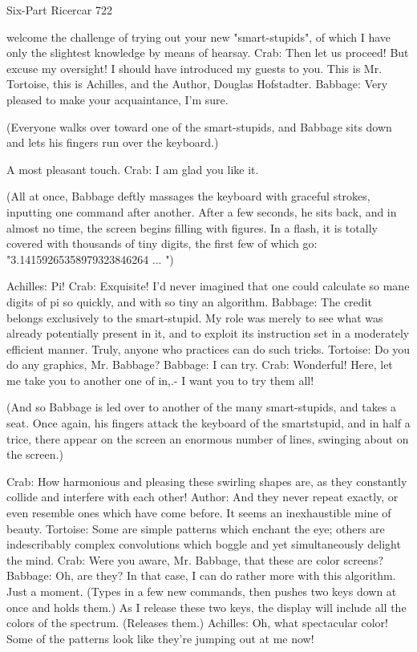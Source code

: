 Six-Part Ricercar                                                                     722

  welcome the challenge of trying out your new "smart-stupids", of which I have only
  the slightest knowledge by means of hearsay.
Crab: Then let us proceed! But excuse my oversight! I should have introduced my guests
  to you. This is Mr. Tortoise, this is Achilles, and the Author, Douglas Hofstadter.
Babbage: Very pleased to make your acquaintance, I'm sure.

   (Everyone walks over toward one of the smart-stupids, and Babbage sits down and
      lets his fingers run over the keyboard.)

   A most pleasant touch. Crab: I am glad you like it.

   (All at once, Babbage deftly massages the keyboard with graceful strokes, inputting
   one command after another. After a few seconds, he sits back, and in almost no
   time, the screen begins filling with figures. In a flash, it is totally covered with
   thousands of tiny digits, the first few of which go: "3.14159265358979323846264
   ... ")

Achilles: Pi!
Crab: Exquisite! I'd never imagined that one could calculate so mane digits of pi so
  quickly, and with so tiny an algorithm. Babbage: The credit belongs exclusively to the
  smart-stupid. My role was
merely to see what was already potentially present in it, and to exploit its instruction set
  in a moderately efficient manner. Truly, anyone who practices can do such tricks.
Tortoise: Do you do any graphics, Mr. Babbage? Babbage: I can try.
Crab: Wonderful! Here, let me take you to another one of in,.- I want you to try them all!

   (And so Babbage is led over to another of the many smart-stupids, and takes a seat.
   Once again, his fingers attack the keyboard of the smartstupid, and in half a trice,
   there appear on the screen an enormous number of lines, swinging about on the
   screen.)

Crab: How harmonious and pleasing these swirling shapes are, as they constantly collide
  and interfere with each other!
Author: And they never repeat exactly, or even resemble ones which have come before. It
  seems an inexhaustible mine of beauty.
Tortoise: Some are simple patterns which enchant the eye; others are indescribably
  complex convolutions which boggle and yet simultaneously delight the mind.
Crab: Were you aware, Mr. Babbage, that these are color screens? Babbage: Oh, are
  they? In that case, I can do rather more with this algorithm. Just a moment. (Types in a
  few new commands, then pushes two keys down at once and holds them.) As I release
  these two keys, the display will include all the colors of the spectrum. (Releases them.)
Achilles: Oh, what spectacular color! Some of the patterns look like they're jumping out
  at me now!




